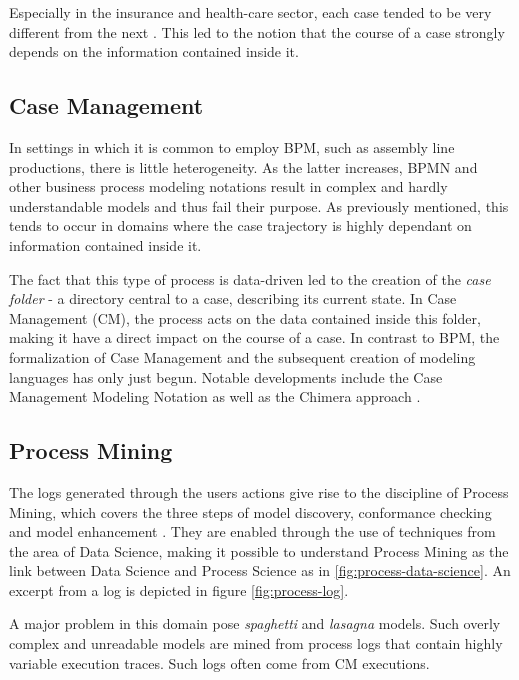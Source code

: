Especially in the insurance and health-care sector, each case tended to be very different from the next \cite{hewelt2016}. This led to the notion that the course of a case strongly depends on the information contained inside it.

\subsection{Case Management}
In settings in which it is common to employ BPM, such as assembly line productions, there is little heterogeneity. As the latter increases, BPMN and other business process modeling notations result in complex and hardly understandable models and thus fail their purpose. As previously mentioned, this tends to occur in domains where the case trajectory is highly dependant on information contained inside it.

The fact that this type of process is data-driven led to the creation of the \textit{case folder} - a directory central to a case, describing its current state. In Case Management (CM), the process acts on the data contained inside this folder, making it have a direct impact on the course of a case. In contrast to BPM, the formalization of Case Management and the subsequent creation of modeling languages has only just begun. Notable developments include the Case Management Modeling Notation \cite{web:cmmn} as well as the Chimera approach \cite{hewelt2016}.

\subsection{Process Mining}
The logs generated through the users actions give rise to the discipline of Process Mining, which covers the three steps of model discovery, conformance checking and model enhancement \cite{Aalst2016}. They are enabled through the use of techniques from the area of Data Science, making it possible to understand Process Mining as the link between Data Science and Process Science as in \autoref{fig:process-data-science}. An excerpt from a log is depicted in figure \ref{fig:process-log}.

A major problem in this domain pose \textit{spaghetti} and \textit{lasagna} models. Such overly complex and unreadable models are mined from process logs that contain highly variable execution traces. Such logs often come from CM executions.

